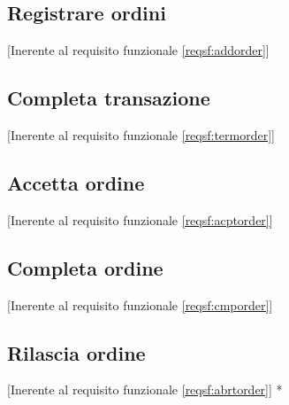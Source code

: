 	\newpage\subsection{Registrare ordini}[Inerente al requisito funzionale \ref{reqsf:addorder}]

	\newpage\subsection{Completa transazione}[Inerente al requisito funzionale \ref{reqsf:termorder}]

	\newpage\subsection{Accetta ordine}[Inerente al requisito funzionale \ref{reqsf:acptorder}]

	\newpage\subsection{Completa ordine}[Inerente al requisito funzionale \ref{reqsf:cmporder}]

	\newpage\subsection{Rilascia ordine}[Inerente al requisito funzionale \ref{reqsf:abrtorder}]
	*
\endgroup
